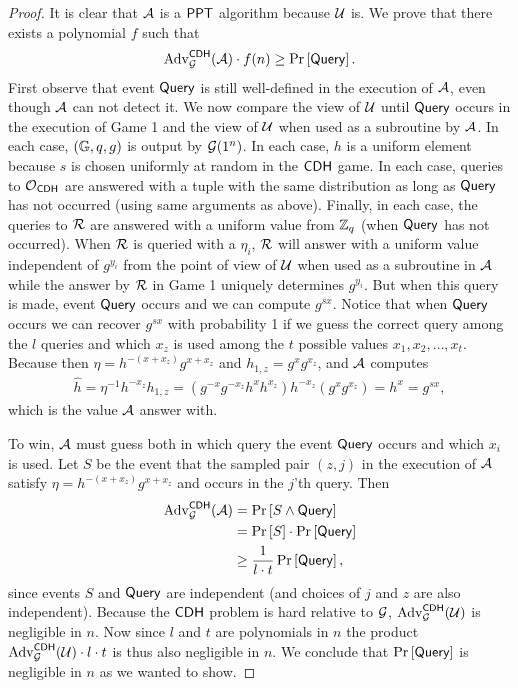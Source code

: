 \begin{proof}
It is clear that $\mathcal{A}$ is a $\mathsf{PPT}$ algorithm because $\mathcal{U}$ is. We prove that there exists a polynomial $f$ such that 
\begin{align}
\label{eq:CDHsubvertProve}
	\operatorname{Adv}_{\operatorname{\mathcal{G}}}^{\mathsf{CDH}}(\mathcal{A})\cdot f(n) \geq \operatorname{Pr}\left[{\mathsf{Query}}\right].
\end{align} 
First observe that event $\mathsf{Query}$ is still well-defined in the execution of $\mathcal{A}$, even though $\mathcal{A}$ can not detect it. We now compare the view of $\mathcal{U}$ until $\mathsf{Query}$ occurs in the execution of Game 1 and the view of $\mathcal{U}$ when used as a subroutine by $\mathcal{A}$. In each case, $(\mathbb{G},q,g)$ is output by $\operatorname{\mathcal{G}}(1^n)$. In each case, $h$ is a uniform element because $s$ is chosen uniformly at random in the $\mathsf{CDH}$ game. In each case, queries to $\operatorname{\mathcal{O}}_{\mathsf{CDH}}$ are answered with a tuple with the same distribution as long as $\mathsf{Query}$ has not occurred (using same arguments as above). Finally, in each case, the queries to $\operatorname{\mathcal{R}}$ are answered with a uniform value from $\mathbb{Z}_q$ (when $\mathsf{Query}$ has not occurred). When $\operatorname{\mathcal{R}}$ is queried with a $\eta_i$, $\operatorname{\mathcal{R}}$ will answer with a uniform value independent of $g^{y_i}$ from the point of view of $\mathcal{U}$ when used as a subroutine in $\mathcal{A}$ while the answer by $\operatorname{\mathcal{R}}$ in Game 1 uniquely determines $g^{y_i}$. But when this query is made, event $\mathsf{Query}$ occurs and we can compute $g^{sx}$. Notice that when $\mathsf{Query}$ occurs we can recover $g^{sx}$ with probability 1 if we guess the correct query among the $l$ queries and which $x_z$ is used among the $t$ possible values $x_1,x_2,\ldots,x_t$. Because then $\eta = h^{-(x+x_z)}g^{x+x_z}$ and $h_{1,z} = g^xg^{x_z}$, and $\mathcal{A}$ computes
\begin{align*}
	\hat{h} = \eta^{-1}h^{-x_z}h_{1,z} = \left(g^{-x}g^{-x_z}h^{x}h^{x_z}\right) h^{-x_z}\left(g^xg^{x_z}\right) = h^x = g^{sx},
\end{align*}
which is the value $\mathcal{A}$ answer with. 

To win, $\mathcal{A}$ must guess both in which query the event $\mathsf{Query}$ occurs and which $x_i$ is used. Let $S$ be the event that the sampled pair $(z,j)$ in the execution of $\mathcal{A}$ satisfy $\eta = h^{-(x+x_z)}g^{x+x_z}$ and occurs in the $j$'th query. Then
\begin{align*}
	\operatorname{Adv}_{\operatorname{\mathcal{G}}}^{\mathsf{CDH}}(\mathcal{A}) &= \operatorname{Pr}\left[{S\wedge \mathsf{Query}}\right] \\
	& = \operatorname{Pr}\left[{S}\right]\cdot\operatorname{Pr}\left[{\mathsf{Query}}\right] \\
	& \geq \frac{1}{l\cdot t}\operatorname{Pr}\left[{\mathsf{Query}}\right],
\end{align*}
since events $S$ and $\mathsf{Query}$ are independent (and choices of $j$ and $z$ are also independent). Because the $\mathsf{CDH}$ problem is hard relative to $\operatorname{\mathcal{G}}$, $\operatorname{Adv}_{\operatorname{\mathcal{G}}}^{\mathsf{CDH}}(\mathcal{U})$ is negligible in $n$. Now since $l$ and $t$ are polynomials in $n$ the product $\operatorname{Adv}_{\operatorname{\mathcal{G}}}^{\mathsf{CDH}}(\mathcal{U})\cdot l\cdot t$ is thus also negligible in $n$. We conclude that $\operatorname{Pr}\left[{\mathsf{Query}}\right]$ is negligible in $n$ as we wanted to show.
\end{proof}

